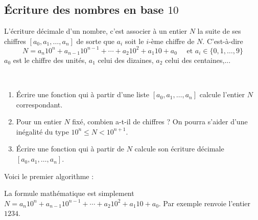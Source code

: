 \documentclass[class=report,crop=false]{standalone}
\begin{document}
\subsection{\'Ecriture des nombres en base $10$}

L'écriture décimale d'un nombre, c'est associer à un entier $N$
la suite de ses chiffres $[a_0,a_1,\ldots,a_n]$ de sorte que $a_i$ soit le $i$-ème chiffre
de $N$. C'est-à-dire
$$N= a_n 10^n+ a_{n-1}10^{n-1}+\cdots + a_2 10^2 + a_1 10 + a_0 \quad \text{ et } a_i \in \{0,1,\ldots,9\}$$
$a_0$ est le chiffre des unités, $a_1$ celui des dizaines, $a_2$ celui des centaines,...
\begin{tp}~
\begin{enumerate}
  \item \'Ecrire une fonction qui à partir d'une liste $[a_0,a_1,\ldots,a_n]$ calcule l'entier $N$ correspondant.
  \item Pour un entier $N$ fixé, combien a-t-il de chiffres ?
  On pourra s'aider d'une inégalité du type $10^n \le N < 10^{n+1}$.
  \item \'Ecrire une fonction qui à partir de $N$ calcule son écriture décimale $[a_0,a_1,\ldots,a_n]$.
\end{enumerate}
\end{tp}


Voici le premier algorithme :

La formule mathématique est simplement $N= a_n 10^n+ a_{n-1}10^{n-1}+\cdots + a_2 10^2 + a_1 10 + a_0$.
Par exemple  renvoie l'entier $1234$.

\bigskip
\end{document}
